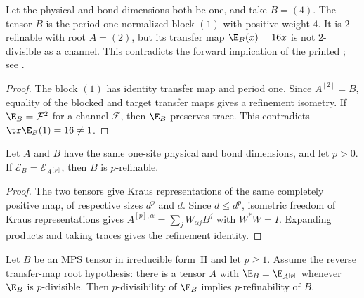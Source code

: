 \begin{lemma}
    \label{thm:periodic_refinement_normalization_counterexample}
    \leanok
    Let the physical and bond dimensions both be one, and take $B=(4)$.
    The tensor $B$ is the period-one normalized block $(1)$
    with positive weight $4$. It is $2$-refinable with root $A=(2)$,
    but its transfer map $\E_B(x)=16x$ is not $2$-divisible as a channel.
    This contradicts the forward implication of the printed
    \cite[Theorem~4.1]{DeLasCuevas2017Irreducible}; see
    \cite{gap:dccsp17_thm41_forward_trace_preservation}.
\end{lemma}

\begin{proof}\leanok
    The block $(1)$ has identity transfer map and period one.
    Since $A^{[2]}=B$, equality of the blocked and target transfer maps
    gives a refinement isometry. If $\E_B=\mathcal F^2$ for a channel
    $\mathcal F$, then $\E_B$ preserves trace. This contradicts
    $\tr \E_B(1)=16\ne 1$.
\end{proof}

\begin{lemma}
    \label{thm:periodic_refinement_from_blocked_transfer}
    \leanok
    Let $A$ and $B$ have the same one-site physical and bond
    dimensions, and let $p>0$. If
    $\mathcal E_B=\mathcal E_{A^{[p]}}$, then $B$ is $p$-refinable.
\end{lemma}

\begin{proof}\leanok
    The two tensors give Kraus representations of the same completely
    positive map, of respective sizes $d^p$ and $d$. Since $d\le d^p$,
    isometric freedom of Kraus representations gives
    $A^{[p],\alpha}=\sum_j W_{\alpha j}B^j$ with $W^*W=I$.
    Expanding products and taking traces gives the refinement identity.
\end{proof}

\begin{lemma}%
    \label{thm:thm_4_1_p_refinement_reverse}
    \leanok
    Let $B$ be an MPS tensor in irreducible form~II and let $p \ge 1$.
    Assume the reverse transfer-map root hypothesis: there is a tensor $A$ with
    $\E_B = \E_{A^{[p]}}$ whenever $\E_B$ is
    $p$-divisible. Then $p$-divisibility of $\E_B$ implies
    $p$-refinability of $B$.
\end{lemma}

